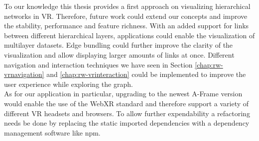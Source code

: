 To our knowledge this thesis provides a first approach on visualizing hierarchical networks in VR. Therefore, future work could extend our concepts and improve the stability, performance and feature richness.
With an added support for links between different hierarchical layers, applications could enable the visualization of multilayer datasets. Edge bundling could further improve the clarity of the visualization and allow displaying larger amounts of links at once. Different navigation and interaction techniques we have seen in Section \ref{chap:rw-vrnavigation} and \ref{chap:rw-vrinteraction} could be implemented to improve the user experience while exploring the graph.\
\\
As for our application in particular, upgrading to the newest A-Frame version would enable the use of the WebXR standard and therefore support a variety of different VR headsets and browsers. To allow further expendability a refactoring needs be done by replacing the static imported dependencies with a dependency management software like npm.


